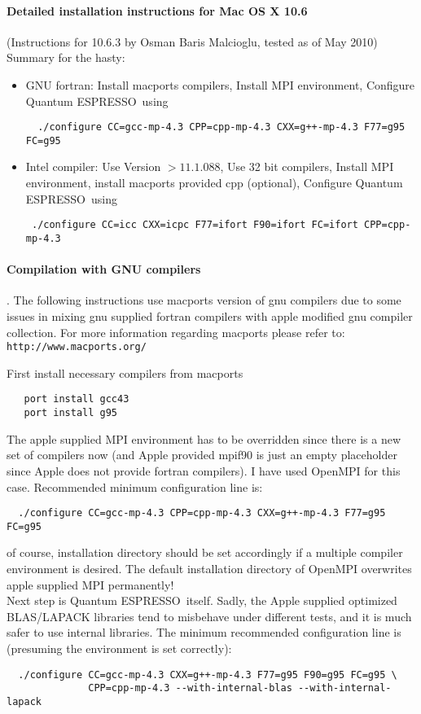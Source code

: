 \documentclass[12pt,a4paper]{article}
\def\qe{{\sc Quantum ESPRESSO}}
\begin{document}
\paragraph{Detailed installation instructions for Mac OS X 10.6}

(Instructions for 10.6.3 by Osman Baris Malcioglu, tested as of May 2010)
Summary for the hasty: 
\begin{itemize}
\item GNU fortran:
Install macports compilers, 
Install MPI environment,
Configure \qe\  using
\begin{verbatim}
  ./configure CC=gcc-mp-4.3 CPP=cpp-mp-4.3 CXX=g++-mp-4.3 F77=g95 FC=g95
\end{verbatim}
\item Intel compiler:
Use Version $>11.1.088$,
Use 32 bit compilers,
Install MPI environment,
install macports provided cpp (optional),
Configure \qe\ using
\begin{verbatim}
 ./configure CC=icc CXX=icpc F77=ifort F90=ifort FC=ifort CPP=cpp-mp-4.3
\end{verbatim}
\end{itemize}

\paragraph{Compilation with GNU compilers}.
The following instructions use macports version of gnu compilers due to some
issues in mixing gnu supplied fortran compilers with apple modified gnu compiler
collection. For more information regarding macports please refer to:
\texttt{http://www.macports.org/}  

First install necessary compilers from macports
\begin{verbatim}
   port install gcc43
   port install g95
\end{verbatim}
The apple supplied MPI environment has to be overridden since there is
a new set of compilers now (and Apple provided mpif90 is just an empty 
placeholder since Apple does not provide fortran compilers). I have used
OpenMPI for this case. Recommended minimum configuration line is:
\begin{verbatim}
  ./configure CC=gcc-mp-4.3 CPP=cpp-mp-4.3 CXX=g++-mp-4.3 F77=g95 FC=g95
\end{verbatim}
of course, installation directory should be set accordingly if a multiple
compiler environment is desired. The default installation directory of 
OpenMPI overwrites apple supplied MPI permanently!\\
Next step is \qe\ itself. Sadly, the Apple supplied optimized BLAS/LAPACK
libraries tend to misbehave under different tests, and it is much safer to
use internal libraries. The minimum recommended configuration
line is (presuming the environment is set correctly):
\begin{verbatim}
  ./configure CC=gcc-mp-4.3 CXX=g++-mp-4.3 F77=g95 F90=g95 FC=g95 \
              CPP=cpp-mp-4.3 --with-internal-blas --with-internal-lapack
\end{verbatim}
\end{document}
